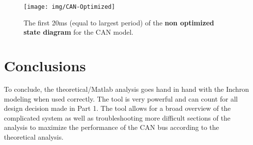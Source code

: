 \begin{figure}[h!]
	\begin{center}
		\texttt{[image: img/CAN-Optimized]}
		\caption{The first 20ms (equal to largest period) of the \textbf{non optimized state diagram} for the CAN model.}
		\label{fig:CANoptimized}
	\end{center}
\end{figure}

\section{Conclusions}

To conclude, the theoretical/Matlab analysis goes hand in hand with the Inchron modeling when used correctly. The tool is very powerful and can count for all design decision made in Part 1. The tool allows for a broad overview of the complicated system as well as troubleshooting more difficult sections of the analysis to maximize the performance of the CAN bus according to the theoretical analysis.

